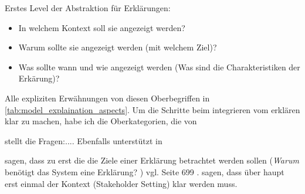 Erstes Level der Abstraktion für Erklärungen:

\begin{itemize}
    \item In welchem Kontext soll sie angezeigt werden? \cite{kohl_explainability_2019, chazette_knowledge_nodate}
    \item Warum sollte sie angezeigt werden (mit welchem Ziel)? \cite{kohl_explainability_2019, rosenfeld_explainability_2019}
    \item Was sollte wann und wie angezeigt werden (Was sind die Charakteristiken der Erkärung)? \cite{kohl_explainability_2019, rosenfeld_explainability_2019}
\end{itemize}

Alle expliziten Erwähnungen von diesen Oberbegriffen in \autoref{tab:model_explaination_aspects}. Um die Schritte beim integrieren vom erklären klar zu machen, habe ich die Oberkategorien, die von 

\cite{rosenfeld_explainability_2019} stellt die Fragen:.... Ebenfalls unterstützt in \cite{chazette2020explainability}

\cite{rosenfeld_explainability_2019} sagen, dass zu erst die die Ziele einer Erklärung betrachtet werden sollen (\glqq \textit{Warum} benötigt das System eine Erklärung? \grqq{}) vgl. Seite 699 \cite{rosenfeld_explainability_2019}. \cite{cirqueira_scenario-based_2020} sagen, dass über haupt erst einmal der Kontext (\glqq Stakeholder Setting\grqq{}) klar werden muss.

